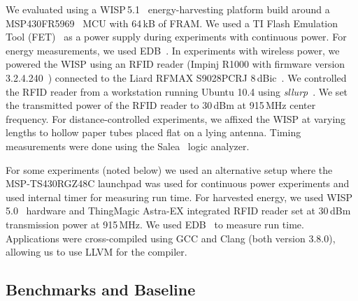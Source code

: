 
We evaluated \sys using a WISP\,5.1~\cite{wisp5,wisp} energy-harvesting platform build around a MSP430FR5969~\cite{wolverine} MCU with 64\,kB of FRAM. We used a TI Flash Emulation Tool (FET)~\cite{fet} as a power supply during experiments with continuous power. For energy measurements, we used EDB~\cite{edb}. In experiments with wireless power, we powered the WISP using an RFID reader (Impinj R1000 with firmware version 3.2.4.240~\cite{r1000_data_sheet}) connected to the Liard RFMAX S9028PCRJ 8\,dBic~\cite{atlas2015}. We controlled the RFID reader from a workstation running Ubuntu 10.4 using \emph{sllurp}~\cite{sllrp_github}. We set the transmitted power of the RFID reader to 30\,dBm at 915\,MHz center frequency. For distance-controlled experiments, we affixed the WISP at varying lengths to hollow paper tubes placed flat on a lying antenna. Timing measurements were done using the Salea~\cite{saleae} logic analyzer.

For some experiments (noted below) we used an alternative setup where the MSP-TS430RGZ48C launchpad was used for continuous power experiments and used internal timer for measuring run time. For harvested energy, we used WISP\,5.0~\cite{wisp5,wisp} hardware and ThingMagic Astra-EX integrated RFID reader set at 30\,dBm transmission power at 915\,MHz. We used EDB~\cite{edb} to measure run time. Applications were cross-compiled using GCC and Clang (both version 3.8.0), allowing us to use LLVM for the \sys compiler. 

\subsection{Benchmarks and Baseline}
\label{sec:results_software}


